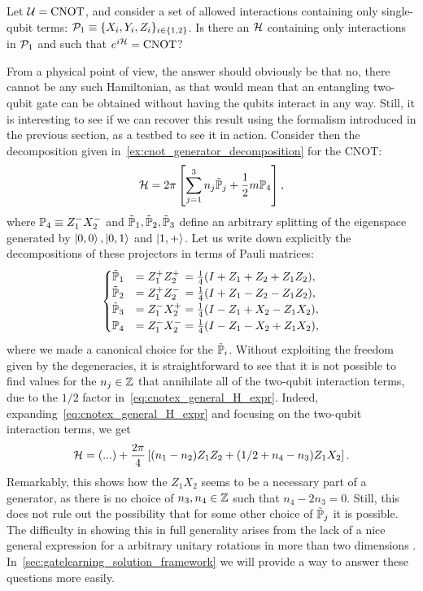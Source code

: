 \begin{example}[label={ex:cnot_physical_constraints}]
Let ${\mathcal{U}}=\operatorname{CNOT}$, and consider a set of allowed interactions containing only single-qubit terms: ${\mathcal{P}}_1\equiv\{X_i,Y_i,Z_i\}_{i\in\{1,2\}}$.
Is there an ${\mathcal{H}}$ containing only interactions in ${\mathcal{P}}_1$ and such that $e^{i{\mathcal{H}}}=\operatorname{CNOT}$?

From a physical point of view, the answer should obviously be that no, there cannot be any such Hamiltonian, as that would mean that an entangling two-qubit gate can be obtained without having the qubits interact in any way.
Still, it is interesting to see if we can recover this result using the formalism introduced in the previous section, as a testbed to see it in action.
Consider then the decomposition given in~\cref{ex:cnot_generator_decomposition} for the CNOT:
\begin{equation}
    {\mathcal{H}} =
    2\pi\left[
    \sum_{j=1}^3 n_j \tilde{\mathbb{P}}_j +
    \frac{1}{2} m\mathbb{P}_4
    \right],
\label{eq:cnotex_general_H_expr}
\end{equation}
where
$\mathbb{P}_4\equiv Z_1^- X_2^-$ and $\tilde{\mathbb{P}}_1,\tilde{\mathbb{P}}_2,\tilde{\mathbb{P}}_3$ define an arbitrary splitting of the eigenspace generated by $\ket{0,0},\ket{0,1}$ and $\ket{1,+}$.
Let us write down explicitly the decompositions of these projectors in terms of Pauli matrices:
\begin{equation}
\begin{cases}
    \tilde{\mathbb{P}}_1 &= Z_1^+ Z_2^+ \,= \frac{1}{4} (I + Z_1 + Z_2 + Z_1 Z_2), \\
    \tilde{\mathbb{P}}_2 &= Z_1^+ Z_2^- \,= \frac{1}{4} (I + Z_1 - Z_2 - Z_1 Z_2), \\
    \tilde{\mathbb{P}}_3 &= Z_1^- X_2^+ = \frac{1}{4} (I - Z_1 + X_2 - Z_1 X_2), \\
    \mathbb{P}_4 &= Z_1^- X_2^- = \frac{1}{4} (I - Z_1 - X_2 + Z_1 X_2),
\end{cases}
\end{equation}
where we made a canonical choice for the $\tilde{\mathbb{P}}_i$.
Without exploiting the freedom given by the degeneracies, it is straightforward to see that it is not possible to find values for the $n_j\in\mathbb{Z}$ that annihilate all of the two-qubit interaction terms, due to the $1/2$ factor in~\cref{eq:cnotex_general_H_expr}.
Indeed, expanding~\cref{eq:cnotex_general_H_expr} and focusing on the two-qubit interaction terms, we get
\begin{equation}
    {\mathcal{H}} = (...) + \frac{2\pi}{4}\left[
    (n_1 - n_2) Z_1 Z_2 +
    (1/2 + n_4 - n_3) Z_1 X_2
    \right].
\end{equation}
Remarkably, this shows how the $Z_1 X_2$ seems to be a necessary part of a generator, as there is no choice of $n_3,n_4\in\mathbb{Z}$ such that $n_4-2 n_3=0$.
Still, this does not rule out the possibility that for some other choice of $\tilde{\mathbb{P}}_j$ it is possible.
The difficulty in showing this in full generality arises from the lack of a nice general expression for a arbitrary unitary rotations in more than two dimensions .
In~\cref{sec:gatelearning_solution_framework} we will provide a way to answer these questions more easily.
\end{example}

